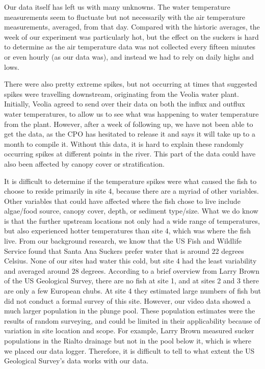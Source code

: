 \documentclass{article}\usepackage[]{graphicx}\usepackage[]{color}
\begin{document}
Our data itself has left us with many unknowns. The water temperature measurements seem to fluctuate but not necessarily with the air temperature measurements, averaged, from that day. Compared with the historic averages, the week of our experiment was particularly hot, but the effect on the suckers is hard to determine as the air temperature data was not collected every fifteen minutes or even hourly (as our data was), and instead we had to rely on daily highs and lows. 

There were also pretty extreme spikes, but not occurring at times that suggested spikes were travelling downstream, originating from the Veolia water plant. Initially, Veolia agreed to send over their data on both the influx and outflux water temperatures, to allow us to see what was happening to water temperature from the plant. However, after a week of following up, we have not been able to get the data, as the CPO has hesitated to release it and says it will take up to a month to compile it. Without this data, it is hard to explain these randomly occurring spikes at different points in the river. This part of the data could have also been affected by canopy cover or stratification. 

It is difficult to determine if the temperature spikes were what caused the fish to choose to reside primarily in site 4, because there are a myriad of other variables. Other variables that could have affected where the fish chose to live include algae/food source, canopy cover, depth, or sediment type/size. What we do know is that the further upstream locations not only had a wide range of temperatures, but also experienced hotter temperatures than site 4, which was where the fish live. From our background research, we know that the US Fish and Wildlife Service found that Santa Ana Suckers prefer water that is around 22 degrees Celsius. None of our sites had water this cold, but site 4 had the least variability and averaged around 28 degrees. According to a brief overview from Larry Brown of the US Geological Survey, there are no fish at site 1, and at sites 2 and 3 there are only a few European chubs. At site 4 they estimated large numbers of fish but did not conduct a formal survey of this site. However, our video data showed a much larger population in the plunge pool. These population estimates were the results of random surveying, and could be limited in their applicability because of variation in site location and scope. For example, Larry Brown measured sucker populations in the Rialto drainage but not in the pool below it, which is where we placed our data logger. Therefore, it is difficult to tell to what extent the US Geological Survey’s data works with our data. 
\end{document}
